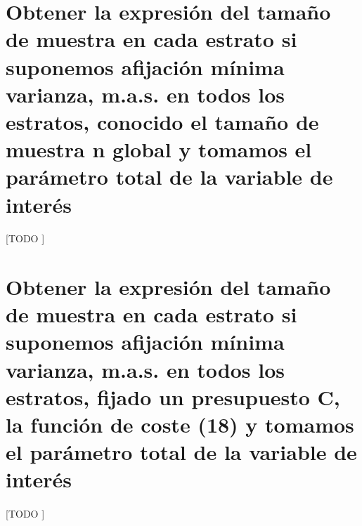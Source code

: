 \documentclass[11pt]{article}
\begin{document}
  \maketitle


  \section{Obtener la expresión del tamaño de muestra en cada estrato si suponemos afijación mínima varianza,  m.a.s. en todos los estratos, conocido el tamaño de muestra n global y tomamos el parámetro total de la variable de interés}

    \paragraph{}
    [TODO ]

  \section{Obtener la expresión del tamaño de muestra en cada estrato si suponemos afijación mínima varianza,  m.a.s. en todos los estratos, fijado un presupuesto C, la función de coste (18)  y tomamos el parámetro total de la variable de interés}

    \paragraph{}
    [TODO ]



  \nocite{muest2017}
  \nocite{sarndal2003model}

  
  
\end{document}
